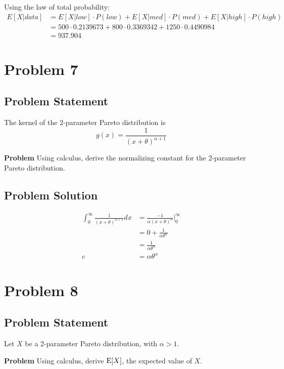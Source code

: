 \documentclass[12pt]{article}
\theoremstyle{definition}
\begin{document}
Using the law of total probability:
\begin{align*}
E[X|data] &= E[X|low] \cdot P(low) + E[X|med] \cdot P(med) + E[X|high] \cdot P(high)\\
&= 500 \cdot 0.2139673 + 800 \cdot 0.3369342 + 1250 \cdot 0.4490984\\
&= 937.904
\end{align*}


\newpage
\section*{Problem 7}

\subsection*{Problem Statement}

The kernel of the 2-parameter Pareto distribution is
$$
g(x) = \frac{1}{(x + \theta)^{\alpha + 1}}
$$

\bigskip
\noindent
{\bf Problem} Using calculus, derive the normalizing constant for the 2-parameter Pareto distribution.


\subsection*{Problem Solution}
\begin{align*}
\int_0^\infty \frac{1}{(x + \theta)^{\alpha + 1}} dx &= \frac{-1}{\alpha(x + \theta)^{\alpha}}\biggr\rvert_0^\infty\\
&= 0 + \frac{1}{\alpha\theta^{\alpha}}\\
&= \frac{1}{\alpha\theta^{\alpha}}\\
c &= \alpha \theta^\alpha
\end{align*}



\newpage
\section*{Problem 8}

\subsection*{Problem Statement}

Let $X$ be a 2-parameter Pareto distribution, with $\alpha > 1$.

\bigskip
\noindent
{\bf Problem} Using calculus, derive $\hbox{E}[X]$, the expected value of $X$.
\end{document}
